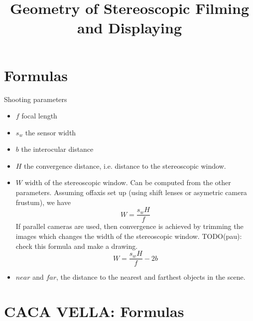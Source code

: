 \documentclass[12pt,a4paper]{article}
\begin{document}
\title{Geometry of Stereoscopic Filming and Displaying}
\author{}
\maketitle
\tableofcontents

\section{Formulas}
Shooting parameters
\begin{itemize}
 \item $f$ focal length
 \item $s_w$ the sensor width
 \item $b$ the interocular distance
 \item $H$ the convergence distance, i.e. distance to the stereoscopic window.
 \item $W$ width of the stereoscopic window. Can be computed from the other parameters. Assuming offaxis set up (using shift lenses or asymetric camera frustum), we have
 \begin{equation}
  W = \frac{s_w H}{f}
 \end{equation}
 If parallel cameras are used, then convergence is achieved by trimming the images which changes the width of the stereoscopic window. TODO(pau): check this formula and make a drawing.
 \begin{equation}
  W = \frac{s_w H}{f} - 2b
 \end{equation}
 \item $near$ and $far$, the distance to the nearest and farthest objects in the scene.
 
\end{itemize}



\section{CACA VELLA: Formulas}
\end{document}

